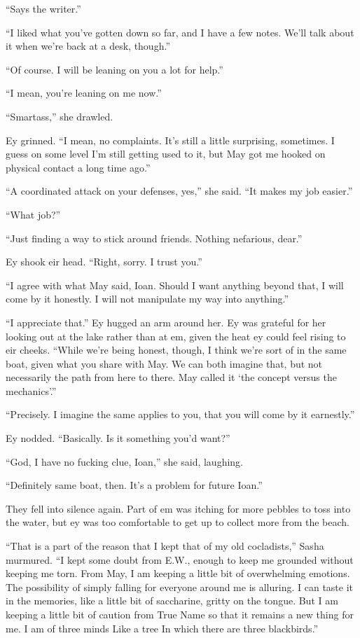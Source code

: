 ``Says the writer.''

``I liked what you've gotten down so far, and I have a few notes. We'll talk about it when we're back at a desk, though.''

``Of course. I will be leaning on you a lot for help.''

``I mean, you're leaning on me now.''

``Smartass,'' she drawled.

Ey grinned. ``I mean, no complaints. It's still a little surprising, sometimes. I guess on some level I'm still getting used to it, but May got me hooked on physical contact a long time ago.''

``A coordinated attack on your defenses, yes,'' she said. ``It makes my job easier.''

``What job?''

``Just finding a way to stick around friends. Nothing nefarious, dear.''

Ey shook eir head. ``Right, sorry. I trust you.''

``I agree with what May said, Ioan. Should I want anything beyond that, I will come by it honestly. I will not manipulate my way into anything.''

``I appreciate that.'' Ey hugged an arm around her. Ey was grateful for her looking out at the lake rather than at em, given the heat ey could feel rising to eir cheeks. ``While we're being honest, though, I think we're sort of in the same boat, given what you share with May. We can both imagine that, but not necessarily the path from here to there. May called it `the concept versus the mechanics'.''

``Precisely. I imagine the same applies to you, that you will come by it earnestly.''

Ey nodded. ``Basically. Is it something you'd want?''

``God, I have no fucking clue, Ioan,'' she said, laughing.

``Definitely same boat, then. It's a problem for future Ioan.''

They fell into silence again. Part of em was itching for more pebbles to toss into the water, but ey was too comfortable to get up to collect more from the beach.

``That is a part of the reason that I kept that of my old cocladists,'' Sasha murmured. ``I kept some doubt from E.W., enough to keep me grounded without keeping me torn. From May, I am keeping a little bit of overwhelming emotions. The possibility of simply falling for everyone around me is alluring. I can taste it in the memories, like a little bit of saccharine, gritty on the tongue. But I am keeping a little bit of caution from True Name so that it remains a new thing for me. I am of three minds Like a tree In which there are three blackbirds.''

